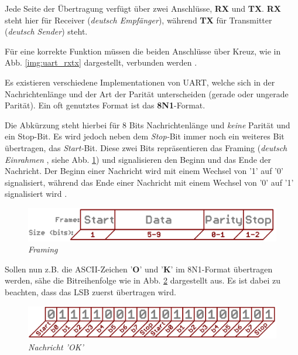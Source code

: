 Jede Seite der Übertragung verfügt über zwei Anschlüsse, \textbf{RX} und \textbf{TX}. \textbf{RX} steht hier
für Receiver (\textit{deutsch Empfänger}), während \textbf{TX} für Transmitter (\textit{deutsch Sender}) steht.

Für eine korrekte Funktion müssen die beiden Anschlüsse über Kreuz, wie in Abb. \ref{img:uart_rxtx} dargestellt, verbunden werden \citep{Mikroprozessortechnik}.

\smallskip

Es existieren verschiedene Implementationen von \ac{UART}, welche sich in der Nachrichtenlänge und der Art der
Parität unterscheiden (gerade oder ungerade Parität). Ein oft genutztes Format ist das \textbf{8N1}-Format.

\smallskip


Die Abkürzung steht hierbei für 8 Bits Nachrichtenlänge und \textit{keine} Parität und ein Stop-Bit. Es wird jedoch neben dem \textit{Stop-}Bit
immer noch ein weiteres Bit übertragen, das \textit{Start-}Bit. Diese zwei Bits repräsentieren das Framing (\textit{deutsch Einrahmen}
, siehe Abb. \ref{img:uart_framing}) und signalisieren den Beginn und das Ende der Nachricht. Der Beginn einer Nachricht wird mit einem 
Wechsel von '1' auf '0' signalisiert, während das Ende einer Nachricht mit einem Wechsel von '0' auf '1' signalisiert wird \citep{Mikroprozessortechnik}. 

\vspace{0.5cm}

\begin{figure}[h]
    \vspace{-\baselineskip}
        \centering
        \includegraphics[scale=0.3]{Pictures/uart_framing.png}
        \caption{\textit{Framing \citep{ImgRXTX}}}
        \label{img:uart_framing}
\end{figure}

Sollen nun z.B. die ASCII-Zeichen '\textbf{O}' und '\textbf{K}' im 8N1-Format übertragen werden, 
sähe die Bitreihenfolge wie in Abb. \ref{img:uart_ok} dargestellt aus. Es ist dabei zu beachten, dass das
\acs{LSB} zuerst übertragen wird.

\vspace{0.5cm}

\begin{figure}[h]
    \vspace{-\baselineskip}
        \centering
        \includegraphics[scale=0.3]{Pictures/uart_ok.png}
        \caption{\textit{Nachricht 'OK' \citep{ImgRXTX}}}
        \label{img:uart_ok}
\end{figure}

